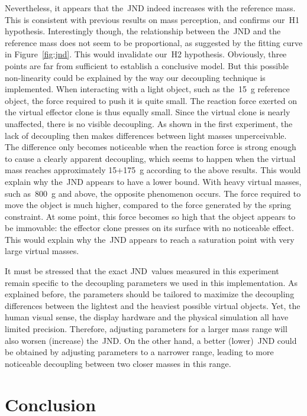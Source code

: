 \documentclass{vgtc}
\begin{document}
Nevertheless, it appears that the~JND indeed increases with the reference mass. This is consistent with previous results on mass perception, and confirms our~H1 hypothesis. Interestingly though, the relationship between the~JND and the reference mass does not seem to be proportional, as suggested by the fitting curve in \mbox{Figure~\ref{fig:jnd}}. This would invalidate our~H2 hypothesis. Obviously, three points are far from sufficient to establish a conclusive model. But this possible non-linearity could be explained by the way our decoupling technique is implemented. When interacting with a light object, such as the~\SI{15}{\gram} reference object, the force required to push it is quite small. The reaction force exerted on the virtual effector clone is thus equally small. Since the virtual clone is nearly unaffected, there is no visible decoupling. As shown in the first experiment, the lack of decoupling then makes differences between light masses unperceivable. The difference only becomes noticeable when the \mbox{reaction} force is strong enough to cause a clearly apparent decoupling, which seems to happen when the virtual mass reaches approximately 15+\SI{175}{\gram} according to the above results. This would explain why the~JND appears to have a lower bound. With heavy virtual masses, such as~\SI{800}{\gram} and above, the opposite phenomenon occurs. The force required to move the object is much higher, compared to the force generated by the spring constraint. At some point, this force \mbox{becomes} so high that the object appears to be immovable: the effector clone presses on its surface with no noticeable effect. This would explain why the~JND appears to reach a saturation point with very large virtual masses.

It must be stressed that the exact JND~values measured in this experiment remain specific to the decoupling parameters we used in this implementation. As explained before, the parameters should be tailored to maximize the decoupling differences between the lightest and the heaviest possible virtual objects. Yet, the human visual sense, the display hardware and the physical simulation all have limited precision. Therefore, adjusting parameters for a larger mass range will also worsen (increase) the~JND. On the other hand, a better (lower)~JND could be obtained by adjusting parameters to a narrower range, leading to more noticeable decoupling between two closer masses in this range.

\section{Conclusion}
\end{document}
